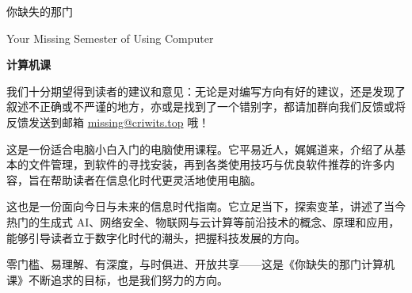 \documentclass[a4paper]{book}
\date{\today}
\begin{document}
\maketitle

\frontmatter
{}
\thispagestyle{empty}
\begin{center}
  \vspace*{1.5cm}
  \fontsize{42pt}{54pt}\selectfont{}\textsf{你缺失的那门}\par
  \fontsize{18pt}{18pt}\selectfont{}\textsf{Your Missing Semester of Using Computer}\par
  \fontsize{54pt}{8pt}\selectfont{}\textbf{\textsf{计算机课}}\par
  \vspace*{2.6cm}
\end{center}

\begin{note}
  我们十分期望得到读者的建议和意见：无论是对编写方向有好的建议，还是发现了叙述不正确或不严谨的地方，亦或是找到了一个错别字，都请加群向我们反馈或将反馈发送到邮箱 \href{mailto:missing@criwits.top}{missing@criwits.top} 哦！
\end{note}

这是一份适合电脑小白入门的电脑使用课程。它平易近人，娓娓道来，介绍了从基本的文件管理，到软件的寻找安装，再到各类使用技巧与优良软件推荐的许多内容，旨在帮助读者在信息化时代更灵活地使用电脑。

这也是一份面向今日与未来的信息时代指南。它立足当下，探索变革，讲述了当今热门的生成式 AI、网络安全、物联网与云计算等前沿技术的概念、原理和应用，能够引导读者立于数字化时代的潮头，把握科技发展的方向。

零门槛、易理解、有深度，与时俱进、开放共享——这是《你缺失的那门计算机课》不断追求的目标，也是我们努力的方向。
\end{document}
